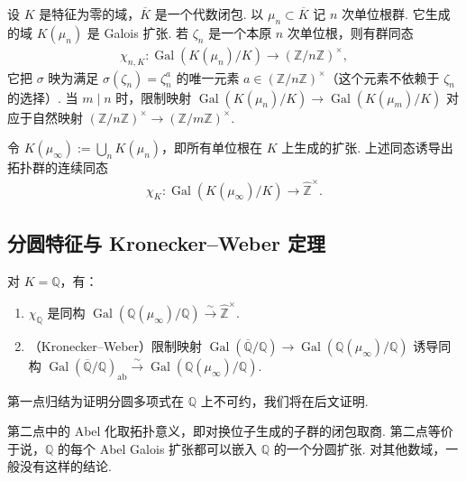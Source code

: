设 $K$ 是特征为零的域，$\overline K$ 是一个代数闭包. 以 $\mu_n\subset\overline K$ 记 $n$ 次单位根群. 它生成的域 $K(\mu_n)$ 是 Galois 扩张. 若 $\zeta_n$ 是一个本原 $n$ 次单位根，则有群同态
\begin{align*}
\chi_{n,K}\colon\operatorname{Gal}(K(\mu_n)/K)\longrightarrow(\mathbb{Z}/n\mathbb{Z})^\times,
\end{align*}
它把 $\sigma$ 映为满足 $\sigma(\zeta_n)=\zeta_n^a$ 的唯一元素 $a\in(\mathbb{Z}/n\mathbb{Z})^\times$（这个元素不依赖于 $\zeta_n$ 的选择）. 当 $m\mid n$ 时，限制映射 $\operatorname{Gal}(K(\mu_n)/K)\longrightarrow\operatorname{Gal}(K(\mu_m)/K)$ 对应于自然映射 $(\mathbb{Z}/n\mathbb{Z})^\times\longrightarrow(\mathbb{Z}/m\mathbb{Z})^\times$.

令 $K(\mu_\infty):=\bigcup_nK(\mu_n)$，即所有单位根在 $K$ 上生成的扩张. 上述同态诱导出拓扑群的连续同态
\begin{align*}
\chi_K\colon\operatorname{Gal}(K(\mu_\infty)/K)\longrightarrow\widehat{\mathbb{Z}}^\times.
\end{align*}
\subsection{分圆特征与 Kronecker--Weber 定理}\label{sec:nt-1-1-4}

\begin{theorem*}

对 $K=\mathbb{Q}$，有：

\begin{enumerate}[label=\roman*)]

\item $\chi_\mathbb{Q}$ 是同构 $\operatorname{Gal}(\mathbb{Q}(\mu_\infty)/\mathbb{Q})\xrightarrow{\sim}\widehat{\mathbb{Z}}^\times$.

\item （Kronecker--Weber）限制映射 $\operatorname{Gal}(\overline{\mathbb{Q}}/\mathbb{Q})\longrightarrow\operatorname{Gal}(\mathbb{Q}(\mu_\infty)/\mathbb{Q})$ 诱导同构 $\operatorname{Gal}(\overline{\mathbb{Q}}/\mathbb{Q})_{\mathrm{ab}}\xrightarrow{\sim}\operatorname{Gal}(\mathbb{Q}(\mu_\infty)/\mathbb{Q})$.

\end{enumerate}

\end{theorem*}

第一点归结为证明分圆多项式在 $\mathbb{Q}$ 上不可约，我们将在后文证明.

第二点中的 Abel 化取拓扑意义，即对换位子生成的子群的闭包取商. 第二点等价于说，$\mathbb{Q}$ 的每个 Abel Galois 扩张都可以嵌入 $\mathbb{Q}$ 的一个分圆扩张. 对其他数域，一般没有这样的结论.

